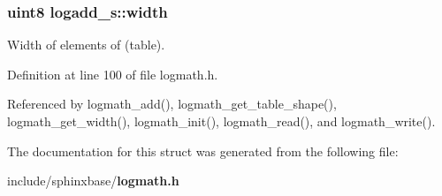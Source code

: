 \subsubsection[{width}]{\setlength{\rightskip}{0pt plus 5cm}uint8 {\bf logadd\-\_\-s\-::width}}\label{structlogadd__s_a8e35a353d751d957270baf5192007c3e}


\-Width of elements of (table). 



\-Definition at line 100 of file logmath.\-h.



\-Referenced by logmath\-\_\-add(), logmath\-\_\-get\-\_\-table\-\_\-shape(), logmath\-\_\-get\-\_\-width(), logmath\-\_\-init(), logmath\-\_\-read(), and logmath\-\_\-write().



\-The documentation for this struct was generated from the following file\-:\begin{DoxyCompactItemize}
\item 
include/sphinxbase/{\bf logmath.\-h}\end{DoxyCompactItemize}
